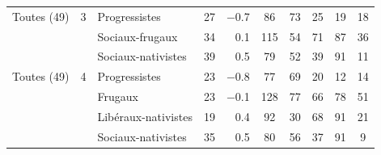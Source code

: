 {\begin{tabular}{lclcrccccc}
\midrule
Toutes (49) & 3 & \cellcolor{cleft!15}Progressistes & \cellcolor{cleft!15}27 & \cellcolor{cleft!15}$-$0.7\hspace{1.5em} & \cellcolor{cleft!15}86 & \cellcolor{cleft!15}73 & \cellcolor{cleft!15}25 & \cellcolor{cleft!15}19 & \cellcolor{cleft!15}18 \\
 &  & \cellcolor{cdjc!15}Sociaux-frugaux & \cellcolor{cdjc!15}34 & \cellcolor{cdjc!15}0.1\hspace{1.5em} & \cellcolor{cdjc!15}115 & \cellcolor{cdjc!15}54 & \cellcolor{cdjc!15}71 & \cellcolor{cdjc!15}87 & \cellcolor{cdjc!15}36 \\
 &  & \cellcolor{ced!15}Sociaux-nativistes & \cellcolor{ced!15}39 & \cellcolor{ced!15}0.5\hspace{1.5em} & \cellcolor{ced!15}79 & \cellcolor{ced!15}52 & \cellcolor{ced!15}39 & \cellcolor{ced!15}91 & \cellcolor{ced!15}11 \\
\midrule
Toutes (49) & 4 & \cellcolor{cleft!15}Progressistes & \cellcolor{cleft!15}23 & \cellcolor{cleft!15}$-$0.8\hspace{1.5em} & \cellcolor{cleft!15}77 & \cellcolor{cleft!15}69 & \cellcolor{cleft!15}20 & \cellcolor{cleft!15}12 & \cellcolor{cleft!15}14 \\
 &  & \cellcolor{cfrug!15}Frugaux & \cellcolor{cfrug!15}23 & \cellcolor{cfrug!15}$-$0.1\hspace{1.5em} & \cellcolor{cfrug!15}128 & \cellcolor{cfrug!15}77 & \cellcolor{cfrug!15}66 & \cellcolor{cfrug!15}78 & \cellcolor{cfrug!15}51 \\
 &  & \cellcolor{ccdroit!15}Libéraux-nativistes & \cellcolor{ccdroit!15}19 & \cellcolor{ccdroit!15}0.4\hspace{1.5em} & \cellcolor{ccdroit!15}92 & \cellcolor{ccdroit!15}30 & \cellcolor{ccdroit!15}68 & \cellcolor{ccdroit!15}91 & \cellcolor{ccdroit!15}21 \\
 &  & \cellcolor{ced!15}Sociaux-nativistes & \cellcolor{ced!15}35 & \cellcolor{ced!15}0.5\hspace{1.5em} & \cellcolor{ced!15}80 & \cellcolor{ced!15}56 & \cellcolor{ced!15}37 & \cellcolor{ced!15}91 & \cellcolor{ced!15}9 \\
\bottomrule
\end{tabular}}
